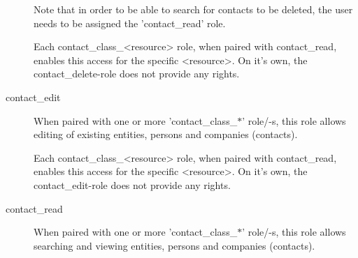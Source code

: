 \begin{description}
                         Note that in order to be able to search for contacts to be deleted, the user
                         needs to be assigned the 'contact\_read' role.

                         Each contact\_class\_\textless{}resource\textgreater{} role, when paired with contact\_read, enables
                         this access for the specific \textless{}resource\textgreater{}. On it's own, the contact\_delete-role
                         does not provide any rights.
\item [contact\_edit] \htmlspacing 
                         When paired with one or more 'contact\_class\_$\ast$' role/-s, this role allows
                         editing of existing entities, persons and companies (contacts).

                         Each contact\_class\_\textless{}resource\textgreater{} role, when paired with contact\_read, enables
                         this access for the specific \textless{}resource\textgreater{}. On it's own, the contact\_edit-role
                         does not provide any rights.
\item [contact\_read] \htmlspacing 
                         When paired with one or more 'contact\_class\_$\ast$' role/-s, this role allows
                         searching and viewing entities, persons and companies (contacts).


\end{description}
